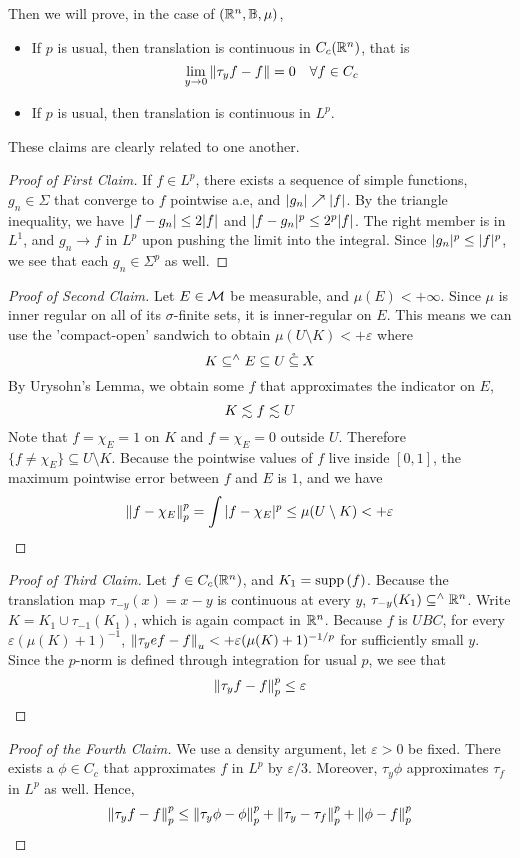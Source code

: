 \documentclass[../../main.tex]{subfiles}
\begin{document}
Then we will prove, in the case of $({\mathbb{R}^n},{\mathbb{B}},\mu)$,
\begin{itemize}
    \item If $p$ is usual, then translation is continuous in $C_c({\mathbb{R}^n})$, that is
    \[
        \lim_{y\to 0}\norm{\tau_y f - f}=0\quad\forall f\in C_c
    \]
    \item If $p$ is usual, then translation is continuous in $L^p$.
\end{itemize}
These claims are clearly related to one another. 
\begin{proof}[Proof of First Claim]
    If $f\in L^p$, there exists a sequence of simple functions, $g_n\in\Sigma$ that converge to $f$ pointwise a.e, and $\vert {g_n} \vert\nearrow \vert {f} \vert$. By the triangle inequality, we have $\vert {f - g_n} \vert\leq 2\vert {f} \vert$ and $\vert {f - g_n} \vert^p \leq 2^p\vert {f} \vert$. The right member is in $L^1$, and $g_n\to f$ in $L^p$ upon pushing the limit into the integral. Since $\vert {g_n} \vert^p\leq \vert {f} \vert^p$, we see that each $g_n\in \Sigma^p$ as well.
\end{proof}
\begin{proof}[Proof of Second Claim]
    Let $E\in\mathcal{M}$ be measurable, and $\mu(E)<+\infty$. Since $\mu$ is inner regular on all of its $\sigma$-finite sets, it is inner-regular on $E$. This means we can use the 'compact-open' sandwich to obtain $\mu(U\setminus K)<+\varepsilon$ where 
    \[
    K\subseteq^\wedge E\subseteq U\:\mathring{\subseteq}\: X
    \]
    By Urysohn's Lemma, we obtain some $f$ that approximates the indicator on $E$,
    \[
        K\lesssim f\lesssim U
    \]
    Note that $f = \chi_E=1$ on $K$ and $f = \chi_E = 0$ outside $U$. Therefore $\{f\neq \chi_E\}\subseteq U\setminus K$. Because the pointwise values of $f$ live inside $[0,1]$, the maximum pointwise error between $f$ and $E$ is $1$, and we have
    \[
        \norm{f-\chi_E}_p^p=\int \vert {f-\chi_E} \vert^p\leq \mu(U\setminus K)<+\varepsilon
    \]
\end{proof}
\begin{proof}[Proof of Third Claim]
    Let $f\in C_c({\mathbb{R}^n})$, and $K_1 = \operatorname{supp}{(f)}$. Because the translation map $\tau_{-y}(x) = x-y$ is continuous at every $y$, $\tau_{-y}(K_1)\subseteq^\wedge{\mathbb{R}^n}$. Write $K = K_1\cup \tau_{-1}(K_1)$, which is again compact in ${\mathbb{R}^n}$. Because $f$ is $UBC$, for every $\varepsilon(\mu(K)+1)^{-1}$, $\norm{\tau_ye f - f}_u<+\varepsilon(\mu(K)+1)^{-1/p}$ for sufficiently small $y$. Since the $p$-norm is defined through integration for usual $p$, we see that 
    \[
        \norm{\tau_y f - f}_p^p\leq \varepsilon
    \]
\end{proof}
\begin{proof}[Proof of the Fourth Claim]
    We use a density argument, let $\varepsilon>0$ be fixed. There exists a $\phi\in C_c$ that approximates $f$ in $L^p$ by $\varepsilon/3$. Moreover, $\tau_y\phi$ approximates $\tau_f$ in $L^p$ as well. Hence,
    \[
        \norm{\tau_y f - f}_p^p\leq \norm{\tau_y \phi - \phi}_p^p + \norm{\tau_y - \tau_f}_p^p + \norm{\phi - f}_p^p
    \]  
\end{proof}
\end{document}
